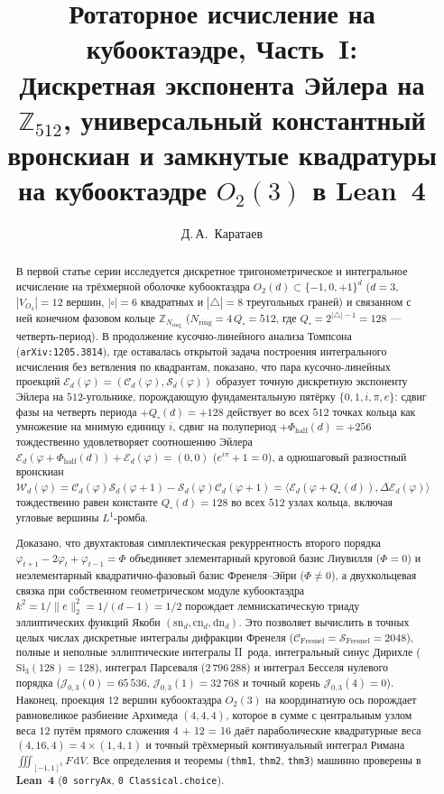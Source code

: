 \documentclass[11pt,a4paper]{article}
\title{\textbf{Ротаторное исчисление на кубооктаэдре, Часть~I:\\ Дискретная экспонента Эйлера на $\mathbb{Z}_{512}$, универсальный константный вронскиан и замкнутые квадратуры на кубооктаэдре $O_2(3)$ в Lean~4}}
\author{Д.\,А.~Каратаев}
\date{}
\theoremstyle{plain}
\theoremstyle{definition}
\begin{document}
\maketitle

\begin{abstract}
В первой статье серии исследуется дискретное тригонометрическое и интегральное исчисление на трёхмерной оболочке кубооктаэдра $O_2(d)\subset\{-1,0,+1\}^d$ ($d=3$, $|V_{O_2}|=12$ вершин, $|\square|=6$ квадратных и $|\triangle|=8$ треугольных граней) и связанном с ней конечном фазовом кольце $\mathbb{Z}_{N_{\mathrm{ring}}}$ ($N_{\mathrm{ring}} = 4\,Q_\square = 512$, где $Q_\square = 2^{|\triangle|-1} = 128$ --- четверть-период). В продолжение кусочно-линейного анализа Томпсона (\texttt{arXiv:1205.3814}), где оставалась открытой задача построения интегрального исчисления без ветвления по квадрантам, показано, что пара кусочно-линейных проекций $\mathcal{E}_d(\varphi) = (\mathcal{C}_d(\varphi),\mathcal{S}_d(\varphi))$ образует точную дискретную экспоненту Эйлера на $512$-угольнике, порождающую фундаментальную пятёрку $\{0,1,i,\pi,e\}$: сдвиг фазы на четверть периода $+Q_\square(d)=+128$ действует во всех $512$ точках кольца как умножение на мнимую единицу $i$, сдвиг на полупериод $+\Phi_{\mathrm{half}}(d)=+256$ тождественно удовлетворяет соотношению Эйлера $\mathcal{E}_d(\varphi+\Phi_{\mathrm{half}}(d))+\mathcal{E}_d(\varphi)=(0,0)$ ($e^{i\pi}+1=0$), а одношаговый разностный вронскиан $\mathcal{W}_d(\varphi)=\mathcal{C}_d(\varphi)\mathcal{S}_d(\varphi+1)-\mathcal{S}_d(\varphi)\mathcal{C}_d(\varphi+1)=\langle \mathcal{E}_d(\varphi+Q_\square(d)),\Delta\mathcal{E}_d(\varphi)\rangle$ тождественно равен константе $Q_\square(d)=128$ во всех $512$ узлах кольца, включая угловые вершины $L^1$-ромба.

Доказано, что двухтактовая симплектическая рекуррентность второго порядка $\varphi_{t+1}-2\varphi_t+\varphi_{t-1}=\Phi$ объединяет элементарный круговой базис Лиувилля ($\Phi=0$) и неэлементарный квадратично-фазовый базис Френеля--Эйри ($\Phi\ne 0$), а двухкольцевая связка при собственном геометрическом модуле кубооктаэдра $k^2 = 1/\|e\|_2^2 = 1/(d-1) = 1/2$ порождает лемнискатическую триаду эллиптических функций Якоби $(\mathrm{sn}_d,\mathrm{cn}_d,\mathrm{dn}_d)$. Это позволяет вычислить в точных целых числах дискретные интегралы дифракции Френеля ($\mathcal{C}_{\mathrm{Fresnel}}=\mathcal{S}_{\mathrm{Fresnel}}=2048$), полные и неполные эллиптические интегралы II~рода, интегральный синус Дирихле ($\mathrm{Si}_3(128)=128$), интеграл Парсеваля ($2\,796\,288$) и интеграл Бесселя нулевого порядка ($\mathcal{J}_{0,3}(0)=65\,536$, $\mathcal{J}_{0,3}(1)=32\,768$ и точный корень $\mathcal{J}_{0,3}(4)=0$). Наконец, проекция $12$ вершин кубооктаэдра $O_2(3)$ на координатную ось порождает равновеликое разбиение Архимеда $(4,4,4)$, которое в сумме с центральным узлом веса $12$ путём прямого сложения 4 + 12 = 16 даёт параболические квадратурные веса $(4,16,4)=4\times(1,4,1)$ и точный трёхмерный континуальный интеграл Римана $\iiint_{[-1,1]^3} F\,\mathrm{d}V$. Все определения и теоремы (\texttt{thm1}, \texttt{thm2}, \texttt{thm3}) машинно проверены в \textbf{Lean~4} (\texttt{0 sorryAx}, \texttt{0 Classical.choice}).


\end{abstract}
\end{document}
